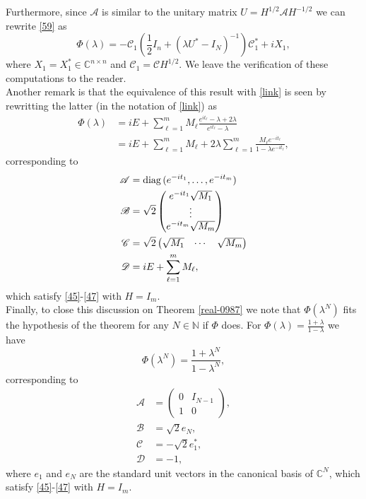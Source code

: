 \documentclass[12pt]{amsart}
\theoremstyle{definition}
\theoremstyle{remark}
\numberwithin{equation}{section}
\begin{document}
 Furthermore, since $\mathscr A$ is similar to the unitary matrix $U=H^{1/2}\mathscr {A}H^{-1/2}$ we can rewrite \eqref{59} as
 \begin{equation}
\Phi(\lambda)=-\mathscr C_1\left(\frac{1}{2}I_n+(\lambda U^*-I_N)^{-1}\right)\mathscr C^*_1+iX_1,
\end{equation}
where $X_1=X_1^*\in\mathbb C^{n\times n}$ and $\mathscr C_1=\mathscr C H^{1/2}$. We leave the verification of these computations to the reader.\\

Another remark is that the equivalence of this result with \eqref{link} is seen by rewritting the latter (in the notation of \eqref{link}) as
\[
  \begin{split}
    \Phi(\lambda)&=iE+\sum_{\ell=1}^mM_\ell \frac{e^{it_\ell}-\lambda+2\lambda}{e^{it_\ell}-\lambda}\\
    &=iE+\sum_{\ell=1}^m M_\ell
      +2\lambda\sum_{\ell=1}^m\frac{M_\ell e^{-it_\ell}}{1-\lambda e^{-it_\ell}},
    \end{split}
  \]
  corresponding to
  \[
    \begin{split}
      \mathscr A&={\rm diag}\,(e^{-it_1},\ldots , e^{-it_m})\\
      \mathscr B&=\sqrt{2}\begin{pmatrix}e^{-it_1}\sqrt{M_1}\\ \vdots \\ e^{-it_m}\sqrt{M_m}\end{pmatrix}\\
      \mathscr C&=\sqrt{2}\begin{pmatrix}\sqrt{M_1}& \cdots &\sqrt{M_m}\end{pmatrix}\\
      \mathscr D&=iE+\sum_{\ell=1}^m M_\ell,
                  \end{split}\]
      which satisfy \eqref{45}-\eqref{47} with $H=I_m$.\\

      Finally, to close this discussion on Theorem \ref{real-0987} we note that $\Phi(\lambda^N)$ fits the hypothesis of the theorem for any $N\in\mathbb N$ if $\Phi$ does. For
      $\Phi(\lambda)=\frac{1+\lambda}{1-\lambda}$ we have
      \[
\Phi(\lambda^N)=\frac{1+\lambda^N}{1-\lambda^N},
\]
corresponding to
  \[
    \begin{split}
      \mathscr A&=\begin{pmatrix} 0&I_{N-1}\\1&0\end{pmatrix},\\
      \mathscr B&=\sqrt{2}e_N,\\
      \mathscr C&=-\sqrt{2}e_1^*,\\
      \mathscr D&=-1,
    \end{split}\]
  where $e_1$ and $e_N$ are the standard unit vectors in the canonical basis of $\mathbb C^N$, which satisfy \eqref{45}-\eqref{47} with $H=I_m$.\\
\end{document}

